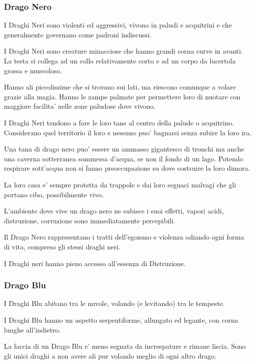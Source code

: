 \documentclass[a4paper,11pt,twoside,openany]{book}
\begin{document}
\subsubsection{Drago Nero} 

I Draghi Neri sono violenti ed aggressivi, vivono in paludi e acquitrini e che generalmente governano come padroni indiscussi.

I Draghi Neri sono creature minacciose che hanno grandi corna curve in avanti.
La testa si collega ad un collo relativamente corto e ad un corpo da lucertola grossa e muscoloso.

Hanno ali piccolissime che si trovano sui lati, ma riescono comunque a volare grazie alla magia.
Hanno le zampe palmate per permettere loro di nuotare con maggiore facilita' nelle zone paludose dove vivono.

I Draghi Neri tendono a fare le loro tane al centro della palude o acquitrino.
Considerano quel territorio il loro e nessuno puo' bagnarsi senza subire la loro ira.

Una tana di drago nero puo' essere un ammasso gigantesco di tronchi ma anche una caverna sotterranea sommersa d'acqua, se non il fondo di un lago.
Potendo respirare sott'acqua non si fanno preoccupazione su dove costruire la loro dimora.

La loro casa e' sempre protetta da trappole e dai loro seguaci malvagi che gli portano cibo, possibilmente vivo.

L'ambiente dove vive un drago nero ne subisce i suoi effetti, vapori acidi, distruzione, corruzione sono immediatamente percepibili.

Il Drago Nero rappresentano i tratti dell'egoismo e violenza odiando ogni forma di vita, compreso gli stessi draghi neri.

I Draghi neri hanno pieno accesso all'essenza di Distruzione.


\subsubsection{Drago Blu} 

I Draghi Blu abitano tra le nuvole, volando (e levitando) tra le tempeste.

I Draghi Blu hanno un aspetto serpentiforme, allungato ed legante, con corna lunghe all'indietro.

La faccia di un Drago Blu e' meno segnata da increspature e rimane liscia.
Sono gli unici draghi a non avere ali pur volando meglio di ogni altro drago.
\end{document}
